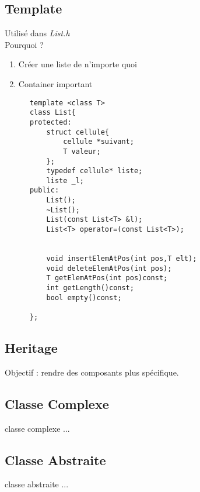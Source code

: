 \documentclass[10pt]{beamer}
\begin{document}
    \subsection{Template}
      \begin{frame}
        Utilisé dans \emph{List.h}\\

        Pourquoi ?
        \begin{enumerate}
          \item Créer une liste de n'importe quoi
          \item Container important
        \end{enumerate}
      \end{frame}
      \begin{verbatim}
      template <class T>
      class List{
      protected:
          struct cellule{
              cellule *suivant;
              T valeur;
          };
          typedef cellule* liste;
          liste _l;
      public:
          List();
          ~List();
          List(const List<T> &l);
          List<T> operator=(const List<T>);


          void insertElemAtPos(int pos,T elt);
          void deleteElemAtPos(int pos);
          T getElemAtPos(int pos)const;
          int getLength()const;
          bool empty()const;

      };
      \end{verbatim}
    \subsection{Heritage}
      \begin{frame}
        Objectif : rendre des composants plus spécifique.
      \end{frame}
    \subsection{Classe Complexe}
      \begin{frame}
        classe complexe ...
      \end{frame}
    \subsection{Classe Abstraite}
      \begin{frame}
        classe abstraite ...
      \end{frame}
\end{document}
